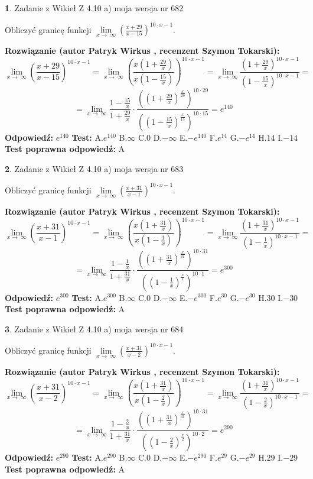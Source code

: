 \documentclass[12pt, a4paper]{article}
\theoremstyle{definition} %
\newtheorem{zad}{}
\newcommand{\zadStart}[1]{\begin{zad}#1\newline}
\newcommand{\zadStop}{\end{zad}}
\newcommand{\rozwStart}[2]{\noindent \textbf{Rozwiązanie (autor #1 , recenzent #2): }\newline}
\newcommand{\rozwStop}{\newline}
\newcommand{\odpStart}{\noindent \textbf{Odpowiedź:}\newline}
\newcommand{\odpStop}{\newline}
\newcommand{\testStart}{\noindent \textbf{Test:}\newline}
\newcommand{\testStop}{\newline}
\newcommand{\kluczStart}{\noindent \textbf{Test poprawna odpowiedź:}\newline}
\newcommand{\kluczStop}{\newline}
\begin{document}
\zadStart{Zadanie z Wikieł Z 4.10 a) moja wersja nr 682}

Obliczyć granicę funkcji  $\lim\limits_{x\to\ \infty}(\frac{x+29}{x-15})^{10\cdot x-1}$.
\zadStop
\rozwStart{Patryk Wirkus}{Szymon Tokarski}
$$\lim\limits_{x\to\ \infty}(\frac{x+29}{x-15})^{10\cdot x-1} = \lim\limits_{x\to\ \infty}(\frac{x(1+\frac{29}{x})}{x(1-\frac{15}{x})})^{10\cdot x-1}=\lim\limits_{x\to\ \infty}\frac{(1+\frac{29}{x})^{10\cdot x-1}}{(1-\frac{15}{x})^{10\cdot x-1}}=$$
$$=\lim\limits_{x\to\ \infty}\frac{1-\frac{15}{x}}{1+\frac{29}{x}}\cdot\frac{((1+\frac{29}{x})^{\frac{x}{29}})^{10\cdot29}}{((1-\frac{15}{x})^{\frac{x}{15}})^{10\cdot15}}=e^{140}$$
\rozwStop
\odpStart
$e^{140}$
\odpStop
\testStart
A.$e^{140}$ B.$\infty$ C.$0$ D.$-\infty$ E.$-e^{140}$
F.$e^{14}$ G.$-e^{14}$
H.$14$
I.$-14$
\testStop
\kluczStart
A
\kluczStop



\zadStart{Zadanie z Wikieł Z 4.10 a) moja wersja nr 683}

Obliczyć granicę funkcji  $\lim\limits_{x\to\ \infty}(\frac{x+31}{x-1})^{10\cdot x-1}$.
\zadStop
\rozwStart{Patryk Wirkus}{Szymon Tokarski}
$$\lim\limits_{x\to\ \infty}(\frac{x+31}{x-1})^{10\cdot x-1} = \lim\limits_{x\to\ \infty}(\frac{x(1+\frac{31}{x})}{x(1-\frac{1}{x})})^{10\cdot x-1}=\lim\limits_{x\to\ \infty}\frac{(1+\frac{31}{x})^{10\cdot x-1}}{(1-\frac{1}{x})^{10\cdot x-1}}=$$
$$=\lim\limits_{x\to\ \infty}\frac{1-\frac{1}{x}}{1+\frac{31}{x}}\cdot\frac{((1+\frac{31}{x})^{\frac{x}{31}})^{10\cdot31}}{((1-\frac{1}{x})^{\frac{x}{1}})^{10\cdot1}}=e^{300}$$
\rozwStop
\odpStart
$e^{300}$
\odpStop
\testStart
A.$e^{300}$ B.$\infty$ C.$0$ D.$-\infty$ E.$-e^{300}$
F.$e^{30}$ G.$-e^{30}$
H.$30$
I.$-30$
\testStop
\kluczStart
A
\kluczStop



\zadStart{Zadanie z Wikieł Z 4.10 a) moja wersja nr 684}

Obliczyć granicę funkcji  $\lim\limits_{x\to\ \infty}(\frac{x+31}{x-2})^{10\cdot x-1}$.
\zadStop
\rozwStart{Patryk Wirkus}{Szymon Tokarski}
$$\lim\limits_{x\to\ \infty}(\frac{x+31}{x-2})^{10\cdot x-1} = \lim\limits_{x\to\ \infty}(\frac{x(1+\frac{31}{x})}{x(1-\frac{2}{x})})^{10\cdot x-1}=\lim\limits_{x\to\ \infty}\frac{(1+\frac{31}{x})^{10\cdot x-1}}{(1-\frac{2}{x})^{10\cdot x-1}}=$$
$$=\lim\limits_{x\to\ \infty}\frac{1-\frac{2}{x}}{1+\frac{31}{x}}\cdot\frac{((1+\frac{31}{x})^{\frac{x}{31}})^{10\cdot31}}{((1-\frac{2}{x})^{\frac{x}{2}})^{10\cdot2}}=e^{290}$$
\rozwStop
\odpStart
$e^{290}$
\odpStop
\testStart
A.$e^{290}$ B.$\infty$ C.$0$ D.$-\infty$ E.$-e^{290}$
F.$e^{29}$ G.$-e^{29}$
H.$29$
I.$-29$
\testStop
\kluczStart
A
\kluczStop
\end{document}

